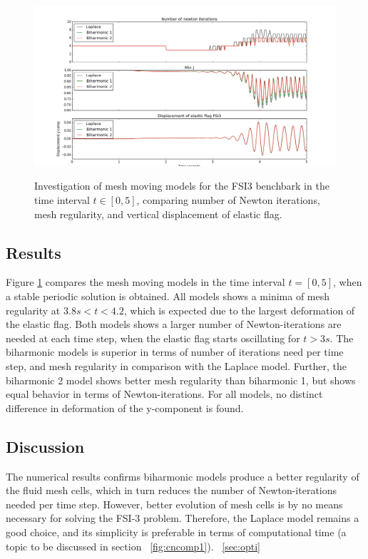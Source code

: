 \newpage
\begin{figure}[h!]
 	\centering
    \includegraphics[scale=0.4]{./Fig/minjcompare.png} \\
      \caption{Investigation of mesh moving models for the FSI3 benchbark in the time interval $t \in [0, 5]$, comparing number of Newton iterations, mesh regularity, and vertical displacement of elastic flag. }
      \label{fig:minjcomp}
\end{figure}

\subsection*{Results}
Figure \ref{fig:minjcomp} compares the mesh moving models in the time interval  $t = [0, 5]$, when a stable periodic solution is obtained. All models shows a minima of mesh regularity at $3.8s < t < 4.2$, which is expected due to the largest deformation of the elastic flag. Both models shows a larger number of Newton-iterations are needed at each time step, when the elastic flag starts oscillating for $t > 3s$. The biharmonic models is superior in terms of number of iterations need per time step, and mesh regularity in comparison with the Laplace model. Further, the biharmonic 2 model shows better mesh regularity than biharmonic 1, but shows equal behavior in terms of Newton-iterations. For all models, no distinct difference in deformation of the y-component is found.

\subsection*{Discussion}
The numerical results confirms biharmonic models produce a better regularity of the fluid mesh cells, which in turn reduces the number of Newton-iterations needed per time step. However,  better evolution of mesh cells is by no means necessary for solving the FSI-3 problem. Therefore, the Laplace model remains a good choice, and its simplicity is preferable in terms of computational time (a topic to be discussed in section ~\ref{fig:cncomp1}). 
~\ref{sec:opti} 


